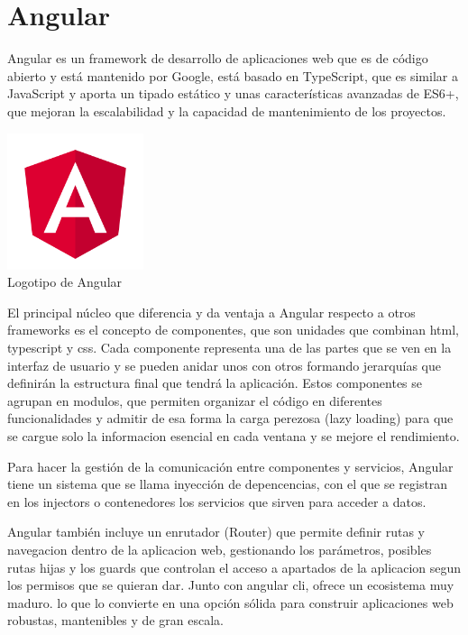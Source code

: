 
\section{Angular}\label{angular}
Angular es un framework de desarrollo de aplicaciones web que es de código abierto y está mantenido por Google, está basado en TypeScript, que es similar a JavaScript y aporta un tipado estático y unas características avanzadas de ES6+, que mejoran la escalabilidad y la capacidad de mantenimiento de los proyectos. 

\begin{center}
  \includegraphics[width=0.3\textwidth]{img/angular-logo.png}\\
  \small Logotipo de Angular
\end{center}

El principal núcleo que diferencia y da ventaja a Angular respecto a otros frameworks es el concepto de componentes, que son unidades que combinan html, typescript y css. Cada componente representa una de las partes que se ven en la interfaz de usuario y se pueden anidar unos con otros formando jerarquías que definirán la estructura final que tendrá la aplicación. Estos componentes se agrupan en modulos, que permiten organizar el código en diferentes funcionalidades y admitir de esa forma la carga perezosa (lazy loading) para que se cargue solo la informacion esencial en cada ventana y se mejore el rendimiento.

Para hacer la gestión de la comunicación entre componentes y servicios, Angular tiene un sistema que se llama inyección de depencencias, con el que se registran en los injectors o contenedores los servicios que sirven para acceder a datos.

Angular también incluye un enrutador (Router) que permite definir rutas y navegacion dentro de la aplicacion web, gestionando los parámetros, posibles rutas hijas y los guards que controlan el acceso a apartados de la aplicacion segun los permisos que se quieran dar. Junto con angular cli, ofrece un ecosistema muy maduro. lo que lo convierte en una opción sólida para construir aplicaciones web robustas, mantenibles y de gran escala.

